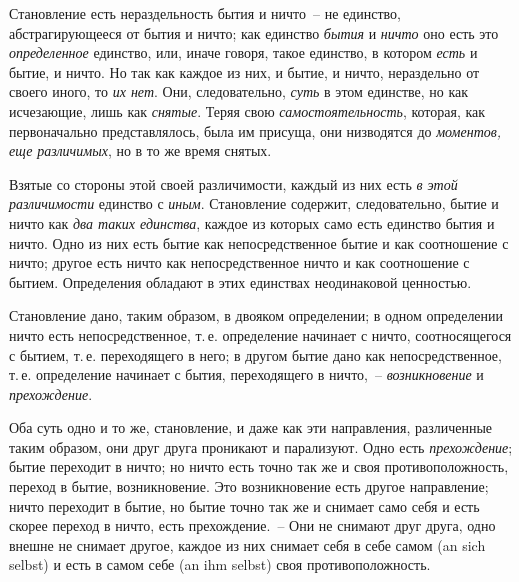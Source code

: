 Становление есть нераздельность бытия и ничто~-- не
единство, абстрагирующееся от бытия и ничто; как единство
\emph{бытия} и \emph{ничто} оно есть это \emph{определенное} единство,
или, иначе говоря, такое единство, в котором \emph{есть} и бытие,
и ничто. Но так как каждое из них, и бытие, и ничто,
нераздельно от своего иного, то \emph{их нет}. Они, следовательно,
\emph{суть} в этом единстве, но как исчезающие, лишь
как \emph{снятые}. Теряя свою \emph{самостоятельность}, которая, как
первоначально представлялось, была им присуща, они
низводятся до \emph{моментов, еще различимых}, но в то же
время снятых.

Взятые со стороны этой своей различимости, каждый
из них есть \emph{в этой различимости} единство с \emph{иным}. Становление
содержит, следовательно, бытие и ничто как \emph{два
таких единства}, каждое из которых само есть единство
бытия и ничто. Одно из них есть бытие как непосредственное
бытие и как соотношение с ничто; другое есть ничто
как непосредственное ничто и как соотношение с бытием.
Определения обладают в этих единствах неодинаковой
ценностью.

Становление дано, таким образом, в двояком определении;
в одном определении ничто есть непосредственное,
т.\,е. определение начинает с ничто, соотносящегося
с бытием, т.\,е. переходящего в него; в другом бытие дано
как непосредственное, т.\,е. определение начинает с бытия,
переходящего в ничто,~-- \emph{возникновение} и \emph{прехождение}.

Оба суть одно и то же, становление, и даже как эти
направления, различенные таким образом, они друг друга
проникают и парализуют. Одно есть \emph{прехождение}; бытие
переходит в ничто; но ничто есть точно так же и своя
противоположность, переход в бытие, возникновение. Это
возникновение есть другое направление; ничто переходит
в бытие, но бытие точно так же и снимает само себя и
есть скорее переход в ничто, есть прехождение.~-- Они не
снимают друг друга, одно внешне не снимает другое,
каждое из них снимает себя в себе самом (an sich selbst)
и есть в самом себе (an ihm selbst) своя противоположность.


